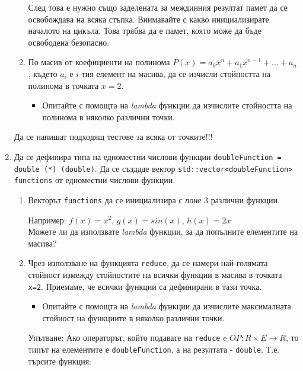 \documentclass[12pt,a4paper]{article}
\begin{document}
\begin{enumerate}
\begin{enumerate}
\begin{mdframed}[hidealllines=true,backgroundcolor=gray!20]
		След това е нужно също заделената за междинния резултат памет да се освобождава на всяка стъпка. Внимавайте с какво инициализирате началото на цикъла. Това трябва да е памет, която може да бъде освободена безопасно.
		\end{mdframed}
		\item По масив от коефициенти на полинома $P(x)=a_0x^n + a_1x^{n-1} + ...+ a_n$, където $a_i$ е $i$-тия елемент на масива, да се изчисли стойността на полинома в точката $x=2$.
		\begin{itemize}
			\item Опитайте с помощта на \textit{lambda} функции да изчислите стойността на полинома в няколко различни точки.
		\end{itemize}

	\end{enumerate}

	Да се напишат подходящ тестове за всяка от точките!!!

	\item Да се дефинира типа на едноместни числови функции \texttt{doubleFunction = double (*) (double)}. Да се създаде вектор \texttt{std::vector<doubleFunction> functions} от едноместни числови функции.

	\begin{enumerate}
		\item Векторът \texttt{functions} да се инициализира с \textit{поне} 3 различни функции.
		\begin{mdframed}[hidealllines=true,backgroundcolor=gray!20]
		Например: $f(x)=x^2$, $g(x)=sin(x)$, $h(x) = 2x$\\

		Можете ли да използвате \textit{lambda} функции, за да попълните елементите на масива?
		\end{mdframed}

		\item Чрез използване на функцията \texttt{reduce}, да се намери най-голямата стойност измежду стойностите на всички функции в масива в точката \texttt{x=2}. Приемаме, че всички функции са дефинирани в тази точка.
			\begin{itemize}
				\item Опитайте с помощта на \textit{lambda} функции да изчислите максималната стойност на функциите в няколко различни точки.
			\end{itemize}
		\begin{mdframed}[hidealllines=true,backgroundcolor=gray!20]
				Упътване: Ако операторът, който подавате на \texttt{reduce}  e $OP: R \times E \rightarrow R$, то типът на елементите е \texttt{doubleFunction}, а на резултата - \texttt{double}. Т.е. търсите функция:\\


\end{mdframed}
\end{enumerate}
\end{enumerate}
\end{document}
